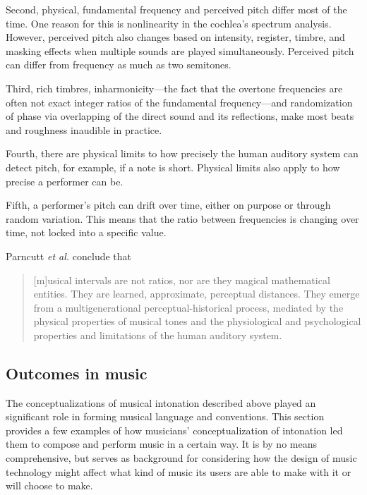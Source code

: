 Second, physical, fundamental frequency and perceived pitch differ most of the time. One reason for this is nonlinearity in the cochlea’s spectrum analysis. However, perceived pitch also changes based on intensity, register, timbre, and masking effects when multiple sounds are played simultaneously. Perceived pitch can differ from frequency as much as two semitones.

Third, rich timbres, inharmonicity---the fact that the overtone frequencies are often not exact integer ratios of the fundamental frequency---and randomization of phase via overlapping of the direct sound and its reflections, make most beats and roughness inaudible in practice.

Fourth, there are physical limits to how precisely the human auditory system can detect pitch, for example, if a note is short. Physical limits also apply to how precise a performer can be.

Fifth, a performer's pitch can drift over time, either on purpose or through random variation. This means that the ratio between frequencies is changing over time, not locked into a specific value.

Parncutt \textit{et al.} conclude that \begin{quotation}[m]usical intervals are not ratios, nor are they magical mathematical entities. They are learned, approximate, perceptual distances. They emerge from a multigenerational perceptual-historical process, mediated by the physical properties of musical tones and the physiological and psychological properties and limitations of the human auditory system.\end{quotation}
 
\subsection{Outcomes in music}
The conceptualizations of musical intonation described above played an significant role in forming musical language and conventions. This section provides a few examples of how musicians' conceptualization of intonation led them to compose and perform music in a certain way. It is by no means comprehensive, but serves as background for considering how the design of music technology might affect what kind of music its users are able to make with it or will choose to make. 

